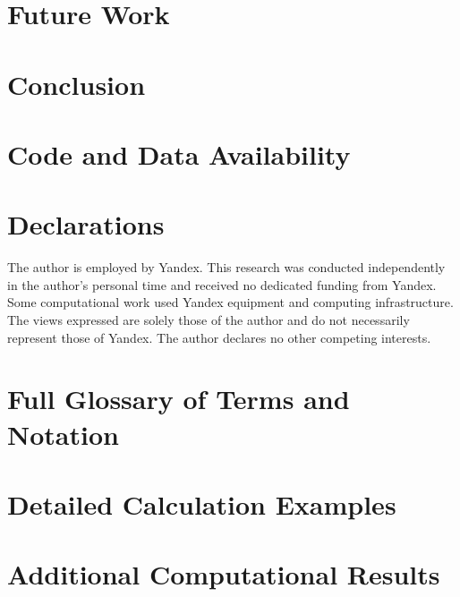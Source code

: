 \documentclass[12pt,a4paper]{article}
\theoremstyle{definition}
\begin{document}
\section{Future Work}


\section{Conclusion}


\section{Code and Data Availability}
\label{sec:availability}


\section*{Declarations}
The author is employed by Yandex. This research was conducted independently in
the author's personal time and received no dedicated funding from Yandex. Some
computational work used Yandex equipment and computing infrastructure. The
views expressed are solely those of the author and do not necessarily represent
those of Yandex. The author declares no other competing interests.




\appendix

\section{Full Glossary of Terms and Notation}
\label{app:glossary}


\section{Detailed Calculation Examples}
\label{app:examples}


\section{Additional Computational Results}
\label{app:experiments}

\end{document}
